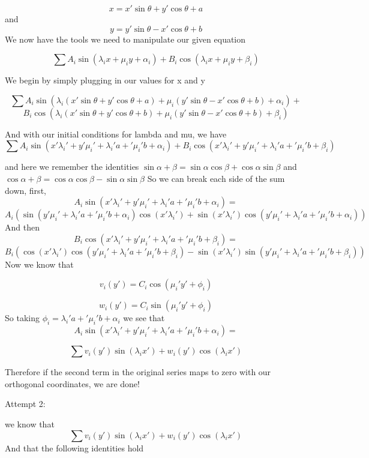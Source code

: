 \documentclass[12pt]{report}
\numberwithin{definition}{section}
\begin{document}
{  \[
 x= x'\sin{\theta}+y'\cos{\theta} + a
 \]
 and 
   \[
 y= y'\sin{\theta}-x'\cos{\theta} + b
 \] 
 We now have the tools we need to manipulate our given equation 
 
 \[
  \sum A_i \sin{( \lambda_i x+\mu_i y+\alpha_i)}+B_i \cos{( \lambda_i x+\mu_i y+\beta_i)}
  \]
  
  We begin by simply plugging in our values for x and y 
 
  \[
  \sum A_i \sin{( \lambda_i (x'\sin{\theta}+y'\cos{\theta} + a)+\mu_i ( y'\sin{\theta}-x'\cos{\theta} + b)+\alpha_i)}+
  \]
  \[B_i \cos{( \lambda_i (x'\sin{\theta}+y'\cos{\theta} + b)+\mu_i (  y'\sin{\theta}-x'\cos{\theta} + b)+\beta_i)}
  \]

 And with our initial conditions for lambda and mu, we have 
 \[
  \sum A_i \sin{(x' \lambda_i'+y'\mu_i'+\lambda_i'a+'\mu_i'b+\alpha_i)}+B_i \cos{(x' \lambda_i'+y'\mu_i' +\lambda_i'a+'\mu_i'b+\beta_i)}
 \]
 
 and here we remember the identities $\sin{\alpha+\beta} = \sin{\alpha}\cos{\beta}+\cos{\alpha}\sin{\beta}$  
 and $\cos{\alpha+\beta} = \cos{\alpha}\cos{\beta}-\sin{\alpha}\sin{\beta}$  
So we can break each side of the sum down, first, 
 \[
A_i \sin{(x' \lambda_i'+y'\mu_i'+\lambda_i'a+'\mu_i'b+\alpha_i)} =
\]
\[
A_i( \sin{(y'\mu_i'+\lambda_i'a+'\mu_i'b+\alpha_i)}\cos{( x' \lambda_i')}+ 
\sin{( x' \lambda_i')}\cos{(y'\mu_i'+\lambda_i'a+'\mu_i'b+\alpha_i)})
\]
  And then 
 \[
 B_i\cos{(x' \lambda_i'+y'\mu_i'+\lambda_i'a+'\mu_i'b+\beta_i)} =
 \]
 \[
  B_i(\cos{(x' \lambda_i')}\cos{(y'\mu_i'+\lambda_i'a+'\mu_i'b+\beta_i)}-\sin{(x' \lambda_i')}\sin{(y'\mu_i'+\lambda_i'a+'\mu_i'b+\beta_i)})
 \]
 Now we know that 
 
  \[
  v_i(y') = C_i \cos{( \mu_i' y'+\phi_i)}
 \]
 
 \[
  w_i(y') = C_i \sin{( \mu_i' y'+\phi_i)}
 \]
So taking $\phi_i = \lambda_i'a+'\mu_i'b+\alpha_i$
we see that 
\[
A_i \sin{(x' \lambda_i'+y'\mu_i'+\lambda_i'a+'\mu_i'b+\alpha_i)} =
\]

\[
  \sum v_i(y') \sin{( \lambda_i x')}+w_i(y') \cos{(\lambda_i x')}
\]
 
 Therefore if the second term in the original series maps to zero with our orthogonal coordinates, we are done! 
 
 
 
 
 
 
      \vspace{20mm}
 
 Attempt 2: 
 
 
 we know that 
  \[
  \sum v_i(y') \sin{( \lambda_i x')}+w_i(y') \cos{(\lambda_i x')}
 \]
 And that the following identities hold 
 
}
\end{document}
